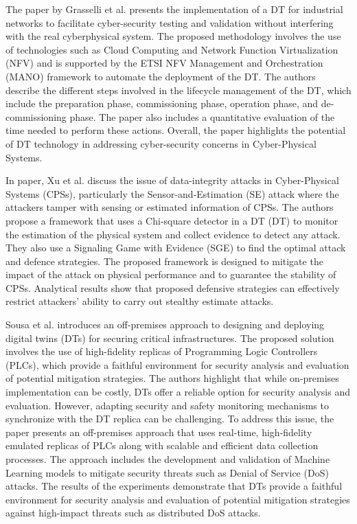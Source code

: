 The paper by Grasselli et al.\cite{grasselliIndustrialNetworkDigital2022} presents the implementation of a DT for industrial networks to facilitate cyber-security testing and validation without interfering with the real cyberphysical system. The proposed methodology involves the use of technologies such as Cloud Computing and Network Function Virtualization (NFV) and is supported by the ETSI NFV Management and Orchestration (MANO) framework to automate the deployment of the DT. The authors describe the different steps involved in the lifecycle management of the DT, which include the preparation phase, commissioning phase, operation phase, and de-commissioning phase. The paper also includes a quantitative evaluation of the time needed to perform these actions. Overall, the paper highlights the potential of DT technology in addressing cyber-security concerns in Cyber-Physical Systems.


In\cite{xuGametheoreticApproachSecure2020} paper, Xu et al. discuss the issue of data-integrity attacks in Cyber-Physical Systems (CPSs), particularly the Sensor-and-Estimation (SE) attack where the attackers tamper with sensing or estimated information of CPSs. The authors propose a framework that uses a Chi-square detector in a DT (DT) to monitor the estimation of the physical system and collect evidence to detect any attack. They also use a Signaling Game with Evidence (SGE) to find the optimal attack and defence strategies. The proposed framework is designed to mitigate the impact of the attack on physical performance and to guarantee the stability of CPSs. Analytical results show that proposed defensive strategies can effectively restrict attackers' ability to carry out stealthy estimate attacks.


Sousa et al.\cite{sousaELEGANTSecurityCritical2021} introduces an off-premises approach to designing and deploying digital twins (DTs) for securing critical infrastructures. The proposed solution involves the use of high-fidelity replicas of Programming Logic Controllers (PLCs), which provide a faithful environment for security analysis and evaluation of potential mitigation strategies. The authors highlight that while on-premises implementation can be costly, DTs offer a reliable option for security analysis and evaluation. However, adapting security and safety monitoring mechanisms to synchronize with the DT replica can be challenging. To address this issue, the paper presents an off-premises approach that uses real-time, high-fidelity emulated replicas of PLCs along with scalable and efficient data collection processes. The approach includes the development and validation of Machine Learning models to mitigate security threats such as Denial of Service (DoS) attacks. The results of the experiments demonstrate that DTs provide a faithful environment for security analysis and evaluation of potential mitigation strategies against high-impact threats such as distributed DoS attacks.

